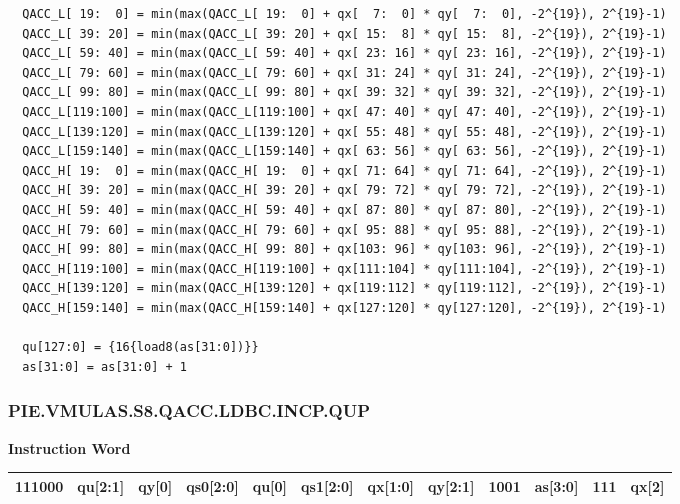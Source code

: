 \begin{lstlisting}
  QACC_L[ 19:  0] = min(max(QACC_L[ 19:  0] + qx[  7:  0] * qy[  7:  0], -2^{19}), 2^{19}-1)
  QACC_L[ 39: 20] = min(max(QACC_L[ 39: 20] + qx[ 15:  8] * qy[ 15:  8], -2^{19}), 2^{19}-1)
  QACC_L[ 59: 40] = min(max(QACC_L[ 59: 40] + qx[ 23: 16] * qy[ 23: 16], -2^{19}), 2^{19}-1)
  QACC_L[ 79: 60] = min(max(QACC_L[ 79: 60] + qx[ 31: 24] * qy[ 31: 24], -2^{19}), 2^{19}-1)
  QACC_L[ 99: 80] = min(max(QACC_L[ 99: 80] + qx[ 39: 32] * qy[ 39: 32], -2^{19}), 2^{19}-1)
  QACC_L[119:100] = min(max(QACC_L[119:100] + qx[ 47: 40] * qy[ 47: 40], -2^{19}), 2^{19}-1)
  QACC_L[139:120] = min(max(QACC_L[139:120] + qx[ 55: 48] * qy[ 55: 48], -2^{19}), 2^{19}-1)
  QACC_L[159:140] = min(max(QACC_L[159:140] + qx[ 63: 56] * qy[ 63: 56], -2^{19}), 2^{19}-1)
  QACC_H[ 19:  0] = min(max(QACC_H[ 19:  0] + qx[ 71: 64] * qy[ 71: 64], -2^{19}), 2^{19}-1)
  QACC_H[ 39: 20] = min(max(QACC_H[ 39: 20] + qx[ 79: 72] * qy[ 79: 72], -2^{19}), 2^{19}-1)
  QACC_H[ 59: 40] = min(max(QACC_H[ 59: 40] + qx[ 87: 80] * qy[ 87: 80], -2^{19}), 2^{19}-1)
  QACC_H[ 79: 60] = min(max(QACC_H[ 79: 60] + qx[ 95: 88] * qy[ 95: 88], -2^{19}), 2^{19}-1)
  QACC_H[ 99: 80] = min(max(QACC_H[ 99: 80] + qx[103: 96] * qy[103: 96], -2^{19}), 2^{19}-1)
  QACC_H[119:100] = min(max(QACC_H[119:100] + qx[111:104] * qy[111:104], -2^{19}), 2^{19}-1)
  QACC_H[139:120] = min(max(QACC_H[139:120] + qx[119:112] * qy[119:112], -2^{19}), 2^{19}-1)
  QACC_H[159:140] = min(max(QACC_H[159:140] + qx[127:120] * qy[127:120], -2^{19}), 2^{19}-1)

  qu[127:0] = {16{load8(as[31:0])}}
  as[31:0] = as[31:0] + 1
\end{lstlisting}

\newpage
\subsubsection{PIE.VMULAS.S8.QACC.LDBC.INCP.QUP}\label{instruction:PIEVMULASS8QACCLDBCINCPQUP}
\setlength\tabcolsep{6pt}
\textbf{Instruction Word} \\
\begin{tabular}{|c|c|c|c|c|c|c|c|c|c|c|c|}
	\hline
	111000 & qu[2:1] & qy[0] & qs0[2:0] & qu[0] & qs1[2:0] & qx[1:0] & qy[2:1] & 1001 & as[3:0] & 111 & qx[2] \\
	\hline
\end{tabular}

